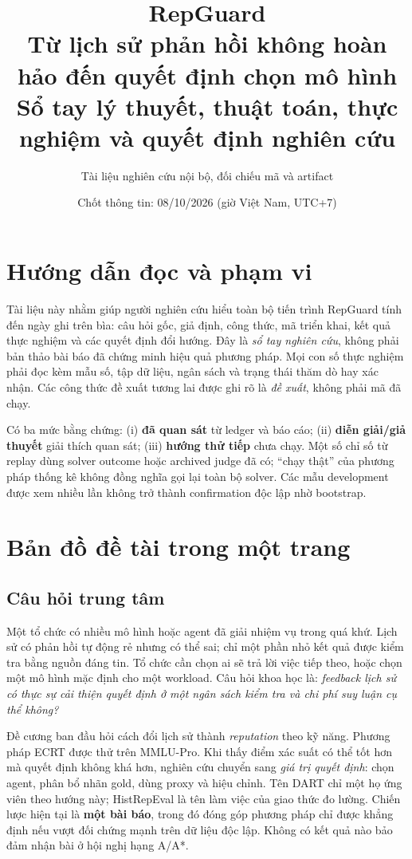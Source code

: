 \documentclass[11pt,a4paper,openany]{book}
\title{\Huge\color{ink} RepGuard\\[6mm]\Large Từ lịch sử phản hồi không hoàn hảo đến quyết định chọn mô hình\\[12mm]\large Sổ tay lý thuyết, thuật toán, thực nghiệm và quyết định nghiên cứu}
\author{Tài liệu nghiên cứu nội bộ, đối chiếu mã và artifact}
\date{Chốt thông tin: 08/10/2026 (giờ Việt Nam, UTC+7)}
\begin{document}
\frontmatter
\maketitle
\chapter*{Hướng dẫn đọc và phạm vi}
Tài liệu này nhằm giúp người nghiên cứu hiểu toàn bộ tiến trình RepGuard tính đến ngày ghi trên bìa: câu hỏi gốc, giả định, công thức, mã triển khai, kết quả thực nghiệm và các quyết định đổi hướng. Đây là \emph{sổ tay nghiên cứu}, không phải bản thảo bài báo đã chứng minh hiệu quả phương pháp. Mọi con số thực nghiệm phải đọc kèm mẫu số, tập dữ liệu, ngân sách và trạng thái thăm dò hay xác nhận. Các công thức đề xuất tương lai được ghi rõ là \emph{đề xuất}, không phải mã đã chạy.

Có ba mức bằng chứng: (i) \textbf{đã quan sát} từ ledger và báo cáo; (ii) \textbf{diễn giải/giả thuyết} giải thích quan sát; (iii) \textbf{hướng thử tiếp} chưa chạy. Một số chỉ số từ replay dùng solver outcome hoặc archived judge đã có; ``chạy thật'' của phương pháp thống kê không đồng nghĩa gọi lại toàn bộ solver. Các mẫu development được xem nhiều lần không trở thành confirmation độc lập nhờ bootstrap.

\tableofcontents
\listoftables
\mainmatter

\chapter{Bản đồ đề tài trong một trang}
\section{Câu hỏi trung tâm}
Một tổ chức có nhiều mô hình hoặc agent đã giải nhiệm vụ trong quá khứ. Lịch sử có phản hồi tự động rẻ nhưng có thể sai; chỉ một phần nhỏ kết quả được kiểm tra bằng nguồn đáng tin. Tổ chức cần chọn ai sẽ trả lời việc tiếp theo, hoặc chọn một mô hình mặc định cho một workload. Câu hỏi khoa học là: \emph{feedback lịch sử có thực sự cải thiện quyết định ở một ngân sách kiểm tra và chi phí suy luận cụ thể không?}

Đề cương ban đầu hỏi cách đổi lịch sử thành \emph{reputation} theo kỹ năng. Phương pháp ECRT được thử trên MMLU-Pro. Khi thấy điểm xác suất có thể tốt hơn mà quyết định không khá hơn, nghiên cứu chuyển sang \emph{giá trị quyết định}: chọn agent, phân bổ nhãn gold, dùng proxy và hiệu chỉnh. Tên DART chỉ một họ ứng viên theo hướng này; HistRepEval là tên làm việc của giao thức đo lường. Chiến lược hiện tại là \textbf{một bài báo}, trong đó đóng góp phương pháp chỉ được khẳng định nếu vượt đối chứng mạnh trên dữ liệu độc lập. Không có kết quả nào bảo đảm nhận bài ở hội nghị hạng A/A*.
\end{document}
